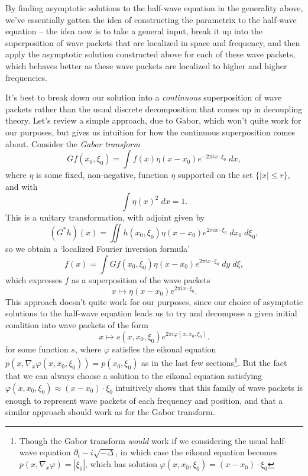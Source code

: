 \documentclass{article}
\theoremstyle{plain}
\theoremstyle{remark}
\theoremstyle{definition}
\begin{document}
By finding asymptotic solutions to the half-wave equation in the generality above, we've essentially gotten the idea of constructing the parametrix to the half-wave equation -- the idea now is to take a general input, break it up into the superposition of wave packets that are localized in space and frequency, and then apply the asymptotic solution constructed above for each of these wave packets, which behaves better as these wave packets are localized to higher and higher frequencies.

It's best to break down our solution into a \emph{continuous} superposition of wave packets rather than the usual discrete decomposition that comes up in decoupling theory. Let's review a simple approach, due to Gabor, which won't quite work for our purposes, but gives us intuition for how the continuous superposition comes about. Consider the \emph{Gabor transform}
%
\[ Gf(x_0,\xi_0) = \int f(x) \eta(x - x_0) e^{- 2 \pi i x \cdot \xi_0}\; dx, \]
%
where $\eta$ is some fixed, non-negative, function $\eta$ supported on the set $\{ |x| \leq r \}$, and with
%
\[ \int \eta(x)^2\; dx = 1. \]
%
This is a unitary transformation, with adjoint given by
%
\[ (G^*h)(x) = \iint h(x_0,\xi_0) \eta(x - x_0) e^{2 \pi i x \cdot \xi_0}\; dx_0\; d\xi_0, \]
%
so we obtain a `localized Fourier inversion formula'
%
\[ f(x) = \int Gf(x_0,\xi_0) \eta(x - x_0) e^{2 \pi i x \cdot \xi_0}\; dy\; d\xi, \]
%
which expresses $f$ as a superposition of the wave packets
%
\[ x \mapsto \eta(x - x_0) e^{2 \pi i x \cdot \xi_0}. \]
%
This approach doesn't quite work for our purposes, since our choice of asymptotic solutions to the half-wave equation leads us to try and decompose a given initial condition into wave packets of the form
%
\[ x \mapsto s(x,x_0,\xi_0) e^{2 \pi i \varphi(x,x_0, \xi_0)}. \]
%
for some function $s$, where $\varphi$ satisfies the eikonal equation $p(x,\nabla_x \varphi(x,x_0,\xi_0)) = p(x_0,\xi_0)$ as in the last few sections\footnote{Though the Gabor transform \emph{would} work if we considering the usual half-wave equation $\partial_t - i \sqrt{-\Delta}$, in which case the eikonal equation becomes $p(x,\nabla_x \varphi) = |\xi_0|$, which has solution $\varphi(x,x_0,\xi_0) = (x - x_0) \cdot \xi_0$}. But the fact that we can always choose a solution to the eikonal equation satisfying $\varphi(x,x_0,\xi_0) \approx (x - x_0) \cdot \xi_0$ intuitively shows that this family of wave packets is enough to represent wave packets of each frequency and position, and that a similar approach should work as for the Gabor transform.
\end{document}
